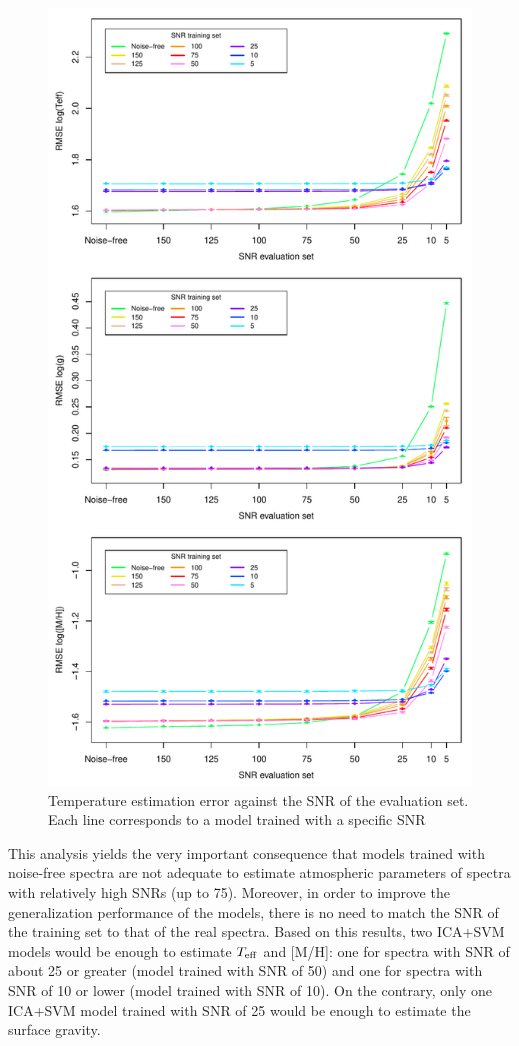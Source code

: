 \documentclass[a4paper,fleqn,usenatbib]{mnras}
\begin{document}
\begin{figure}
\centering\includegraphics[width=\columnwidth]{snr_errors_log_global.pdf}
\caption{Temperature estimation error against the SNR of the evaluation set. Each line corresponds to a model trained with a specific SNR}
\label{fig:snrtrain}
\end{figure}

This analysis yields the very important consequence that models
trained with noise-free spectra are not adequate to estimate
atmospheric parameters of spectra with relatively high SNRs (up to
75). Moreover, in order to improve the generalization performance of
the models, there is no need to match the SNR of the training set to
that of the real spectra. Based on this results, two ICA+SVM models
would be enough to estimate $T_{\rm eff}$ and [M/H]: one for spectra 
with SNR of about 25 or greater (model trained with SNR of 50) and 
one for spectra with SNR of 10 or lower (model trained with SNR of 10).
On the contrary, only one ICA+SVM model trained with SNR of 25 would 
be enough to estimate the surface gravity.
\end{document}
